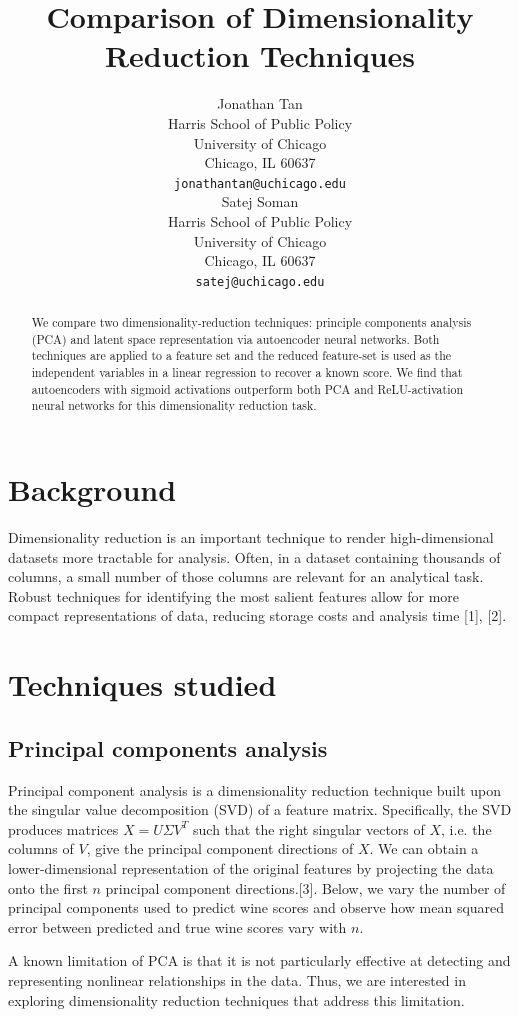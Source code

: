 \documentclass{article}
\title{Comparison of Dimensionality Reduction Techniques}
\author{%
  Jonathan Tan \\
  Harris School of Public Policy\\
  University of Chicago\\
  Chicago, IL 60637 \\
  \texttt{jonathantan@uchicago.edu} \\
  \And
  Satej Soman \\
  Harris School of Public Policy\\
  University of Chicago\\
  Chicago, IL 60637 \\
  \texttt{satej@uchicago.edu} \\
}
\begin{document}
\maketitle

\begin{abstract}
  We compare two dimensionality-reduction techniques: principle components analysis (PCA) and latent space representation via autoencoder neural networks. Both techniques are applied to a feature set and the reduced feature-set is used as the independent variables in a linear regression to recover a known score. We find that autoencoders with sigmoid activations outperform both PCA and ReLU-activation neural networks for this dimensionality reduction task. 
\end{abstract}

\section{Background}
Dimensionality reduction is an important technique to render high-dimensional datasets more tractable for analysis. Often, in a dataset containing thousands of columns, a small number of those columns are relevant for an analytical task. Robust techniques for identifying the most salient features allow for more compact representations of data, reducing storage costs and analysis time [1], [2].

\section{Techniques studied}
\subsection{Principal components analysis}
Principal component analysis is a dimensionality reduction technique built upon the singular value decomposition (SVD) of a feature matrix. Specifically, the SVD produces matrices $X = U \Sigma V^T$ such that the right singular vectors of $X$, i.e. the columns of $V$, give the principal component directions of $X$. We can obtain a lower-dimensional representation of the original features by projecting the data onto the first $n$ principal component directions.[3]. Below, we vary the number of principal components used to predict wine scores and observe how mean squared error between predicted and true wine scores vary with $n$.

A known limitation of PCA is that it is not particularly effective at detecting and representing nonlinear relationships in the data. Thus, we are interested in exploring dimensionality reduction techniques that address this limitation.
\end{document}
